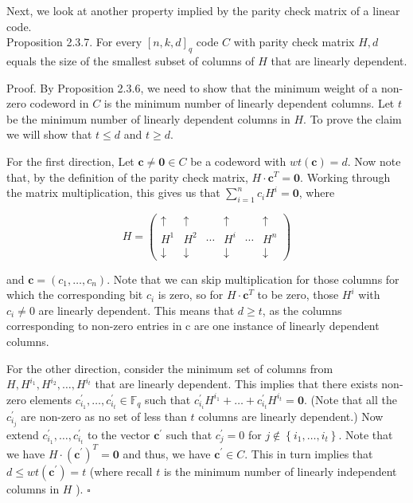 \documentclass[10pt]{article}
\begin{document}
Next, we look at another property implied by the parity check matrix of a linear code.\\
Proposition 2.3.7. For every $[n, k, d]_{q}$ code $C$ with parity check matrix $H, d$ equals the size of the smallest subset of columns of $H$ that are linearly dependent.

Proof. By Proposition 2.3.6, we need to show that the minimum weight of a non-zero codeword in $C$ is the minimum number of linearly dependent columns. Let $t$ be the minimum number of linearly dependent columns in $H$. To prove the claim we will show that $t \leq d$ and $t \geq d$.

For the first direction, Let $\mathbf{c} \neq \mathbf{0} \in C$ be a codeword with $w t(\mathbf{c})=d$. Now note that, by the definition of the parity check matrix, $H \cdot \mathbf{c}^{T}=\mathbf{0}$. Working through the matrix multiplication, this gives us that $\sum_{i=1}^{n} c_{i} H^{i}=\mathbf{0}$, where

$$
H=\left(\begin{array}{cccccc}
\uparrow & \uparrow & & \uparrow & & \uparrow \\
H^{1} & H^{2} & \cdots & H^{i} & \cdots & H^{n} \\
\downarrow & \downarrow & & \downarrow & & \downarrow
\end{array}\right)
$$

and $\mathbf{c}=\left(c_{1}, \ldots, c_{n}\right)$. Note that we can skip multiplication for those columns for which the corresponding bit $c_{i}$ is zero, so for $H \cdot \mathbf{c}^{T}$ to be zero, those $H^{i}$ with $c_{i} \neq 0$ are linearly dependent. This means that $d \geq t$, as the columns corresponding to non-zero entries in c are one instance of linearly dependent columns.

For the other direction, consider the minimum set of columns from $H, H^{i_{1}}, H^{i_{2}}, \ldots, H^{i_{t}}$ that are linearly dependent. This implies that there exists non-zero elements $c_{i_{1}}^{\prime}, \ldots, c_{i_{t}}^{\prime} \in \mathbb{F}_{q}$ such that $c_{i_{i}}^{\prime} H^{i_{1}}+\ldots+c_{i_{t}}^{\prime} H^{i_{t}}=\mathbf{0}$. (Note that all the $c_{i_{j}}^{\prime}$ are non-zero as no set of less than $t$ columns are linearly dependent.) Now extend $c_{i_{1}}^{\prime}, \ldots, c_{i_{t}}^{\prime}$ to the vector $\mathbf{c}^{\prime}$ such that $c_{j}^{\prime}=0$ for $j \notin\left\{i_{1}, \ldots, i_{t}\right\}$. Note that we have $H \cdot\left(\mathbf{c}^{\prime}\right)^{T}=\mathbf{0}$ and thus, we have $\mathbf{c}^{\prime} \in C$. This in turn implies that $d \leq w t\left(\mathbf{c}^{\prime}\right)=t$ (where recall $t$ is the minimum number of linearly independent columns in $H$ ). \(\square\)
\end{document}
